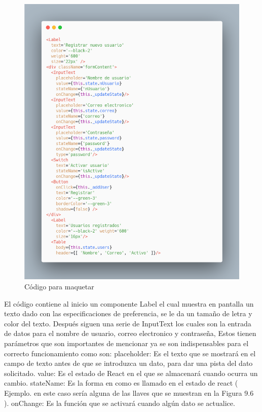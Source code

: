 \newline
\begin{figure}[H]
    \includegraphics[width=1\textwidth]{./Imagenes/9.8}
   \centering 
    \caption[Código para maquetar]{Código para maquetar}
    \end{figure}
\newline

El código contiene al inicio un componente Label el cual muestra en pantalla un texto dado con las especificaciones de preferencia, se le da un tamaño de letra y color del texto. Después siguen una serie de InputText los cuales son la entrada de datos para el nombre de usuario, correo electronico  y contraseña, Estos tienen parámetros que son importantes de mencionar ya se son indispensables para el correcto funcionamiento como son:
placeholder: Es el texto que se mostrará en el campo de texto antes de que se introduzca un dato, para dar una pista del dato solicitado.
value: Es el estado de React en el que se almacenará cuando ocurra un cambio.
stateName: Es la forma en como es llamado en el estado de react ( Ejemplo. en este caso sería alguna de las llaves que se muestran en la Figura 9.6 ).
onChange: Es la función que se activará cuando algún dato se actualice.

